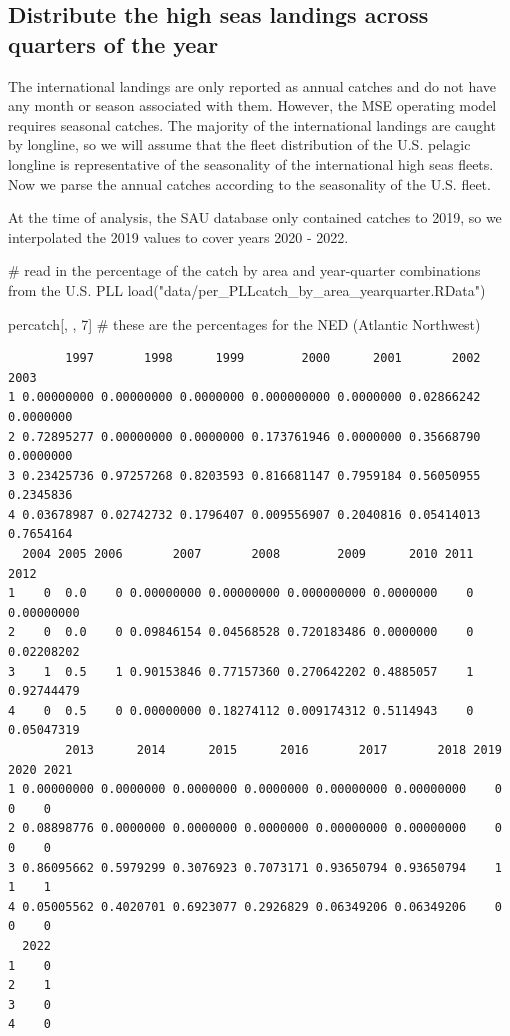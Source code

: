 \documentclass[
]{article}
\newenvironment{Shaded}{\begin{snugshade}}{\end{snugshade}}
\newcommand{\CommentTok}[1]{\textcolor[rgb]{0.37,0.37,0.37}{#1}}
\newcommand{\DecValTok}[1]{\textcolor[rgb]{0.68,0.00,0.00}{#1}}
\newcommand{\FunctionTok}[1]{\textcolor[rgb]{0.28,0.35,0.67}{#1}}
\newcommand{\NormalTok}[1]{\textcolor[rgb]{0.00,0.23,0.31}{#1}}
\newcommand{\StringTok}[1]{\textcolor[rgb]{0.13,0.47,0.30}{#1}}
\begin{document}
\subsection{Distribute the high seas landings across quarters of the
year}\label{distribute-the-high-seas-landings-across-quarters-of-the-year}

The international landings are only reported as annual catches and do
not have any month or season associated with them. However, the MSE
operating model requires seasonal catches. The majority of the
international landings are caught by longline, so we will assume that
the fleet distribution of the U.S. pelagic longline is representative of
the seasonality of the international high seas fleets. Now we parse the
annual catches according to the seasonality of the U.S. fleet.

At the time of analysis, the SAU database only contained catches to
2019, so we interpolated the 2019 values to cover years 2020 - 2022.

\begin{Shaded}
\begin{Highlighting}[]
\CommentTok{\# read in the percentage of the catch by area and year{-}quarter combinations from the U.S. PLL}
\FunctionTok{load}\NormalTok{(}\StringTok{"data/per\_PLLcatch\_by\_area\_yearquarter.RData"}\NormalTok{)  }

\NormalTok{percatch[, , }\DecValTok{7}\NormalTok{] }\CommentTok{\# these are the percentages for the NED (Atlantic Northwest)}
\end{Highlighting}
\end{Shaded}

\begin{verbatim}
        1997       1998      1999        2000      2001       2002      2003
1 0.00000000 0.00000000 0.0000000 0.000000000 0.0000000 0.02866242 0.0000000
2 0.72895277 0.00000000 0.0000000 0.173761946 0.0000000 0.35668790 0.0000000
3 0.23425736 0.97257268 0.8203593 0.816681147 0.7959184 0.56050955 0.2345836
4 0.03678987 0.02742732 0.1796407 0.009556907 0.2040816 0.05414013 0.7654164
  2004 2005 2006       2007       2008        2009      2010 2011       2012
1    0  0.0    0 0.00000000 0.00000000 0.000000000 0.0000000    0 0.00000000
2    0  0.0    0 0.09846154 0.04568528 0.720183486 0.0000000    0 0.02208202
3    1  0.5    1 0.90153846 0.77157360 0.270642202 0.4885057    1 0.92744479
4    0  0.5    0 0.00000000 0.18274112 0.009174312 0.5114943    0 0.05047319
        2013      2014      2015      2016       2017       2018 2019 2020 2021
1 0.00000000 0.0000000 0.0000000 0.0000000 0.00000000 0.00000000    0    0    0
2 0.08898776 0.0000000 0.0000000 0.0000000 0.00000000 0.00000000    0    0    0
3 0.86095662 0.5979299 0.3076923 0.7073171 0.93650794 0.93650794    1    1    1
4 0.05005562 0.4020701 0.6923077 0.2926829 0.06349206 0.06349206    0    0    0
  2022
1    0
2    1
3    0
4    0
\end{verbatim}
\end{document}
